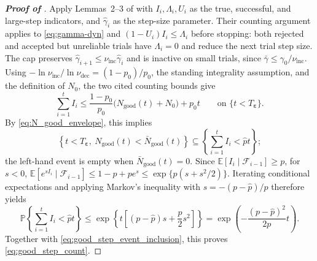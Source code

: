 \documentclass{article}
\begin{document}
\begin{proof}[\textbf{Proof of }]
\label{proof:good_step_growth}
Apply Lemmas~2--3 of
\cite{scheinberg2025stochasticadaptiveoptimizationunreliable}
with \(I_i,\Lambda_i,U_i\) as the true, successful, and large-step
indicators, and \(\hat\gamma_i\) as the step-size parameter.
Their counting argument applies to \eqref{eq:gamma-dyn} and
\((1-U_i)I_i\le\Lambda_i\) before stopping: both rejected and
accepted but unreliable trials have \(\Lambda_i=0\) and reduce the
next trial step size. The cap preserves
\(\hat\gamma_{i+1}\le\nu_{\mathrm{inc}}\hat\gamma_i\) and is inactive
on small trials, since \(\bar\gamma\le\gamma_0/\nu_{\mathrm{inc}}\).
Using \(-\ln\nu_{\mathrm{inc}}/\ln\nu_{\mathrm{dec}}=(1-p_0)/p_0\), the
standing integrality assumption, and the definition of \(N_0\), the
two cited counting bounds give
\begin{equation}\label{eq:good_step_pathwise_count}
\sum_{i=1}^t I_i
\le \frac{1-p_0}{p_0}\bigl(N_{\mathrm{good}}(t)+N_0\bigr)+p_0t
\qquad\text{on }\{t<T_{\boldsymbol\varepsilon}\}.
\end{equation}
By \eqref{eq:N_good_envelope}, this implies
\begin{equation}\label{eq:good_step_event_inclusion}
\textstyle\left\{t<T_{\boldsymbol\varepsilon},\
N_{\mathrm{good}}(t)<\bar N_{\mathrm{good}}(t)\right\}
\subseteq
\left\{\sum_{i=1}^t I_i<\hat p t\right\};
\end{equation}
the left-hand event is empty when \(\bar N_{\mathrm{good}}(t)=0\).
Since \(\mathbb E[I_i\mid\mathcal F_{i-1}]\ge p\), for \(s<0\),
\(\mathbb E[e^{sI_i}\mid\mathcal F_{i-1}]
\le1-p+pe^s\le\exp\{p(s+s^2/2)\}\).
Iterating conditional expectations and applying Markov's inequality
with \(s=-(p-\hat p)/p\) therefore yields
\begin{equation}\label{eq:true_trial_count_tail}
\mathbb P\left\{\sum_{i=1}^t I_i<\hat p t\right\}
\le\exp\!\left\{t\left[(p-\hat p)s+\frac p2s^2\right]\right\}
=\exp\!\left(-\frac{(p-\hat p)^2}{2p}t\right).
\end{equation}
Together with \eqref{eq:good_step_event_inclusion}, this proves
\eqref{eq:good_step_count}.
\end{proof}
\end{document}
